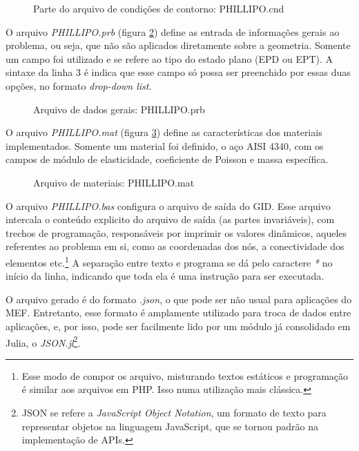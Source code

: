 \begin{figure}[hbtp]
    \caption{Parte do arquivo de condições de contorno: PHILLIPO.cnd}
    
    \label{fig:PHILLIPO.cnd_2}
\end{figure}

O arquivo \emph{PHILLIPO.prb} (figura \ref{fig:PHILLIPO.prb}) define as entrada de informações gerais ao problema, ou seja, que não são aplicados diretamente sobre a geometria. Somente um campo foi utilizado e se refere ao tipo do estado plano (EPD ou EPT). A sintaxe da linha 3 é indica que esse campo só possa ser preenchido por essas duas opções, no formato \emph{drop-down list}.
\begin{figure}[hbtp]
    \caption{Arquivo de dados gerais: PHILLIPO.prb}
    
    \label{fig:PHILLIPO.prb}
\end{figure}

O arquivo \emph{PHILLIPO.mat} (figura \ref{fig:PHILLIPO.mat}) define as características dos materiais implementados. Somente um material foi definido, o aço AISI 4340, com os campos de módulo de elasticidade, coeficiente de Poisson e massa específica.

\begin{figure}[hbtp]
    \caption{Arquivo de materiais: PHILLIPO.mat}
    
    \label{fig:PHILLIPO.mat}
\end{figure}

O arquivo \emph{PHILLIPO.bas} configura o arquivo de saída do GID. Esse arquivo intercala o conteúdo explicito do arquivo de saída (as partes invariáveis), com trechos de programação, responsáveis por imprimir os valores dinâmicos, aqueles referentes ao problema em si, como as coordenadas dos nós, a conectividade dos elementos etc.\footnote{Esse modo de compor os arquivo, misturando textos estáticos e programação é similar aos arquivos em PHP. Isso numa utilização mais clássica.} A separação entre texto e programa se dá pelo caractere \emph{*} no início da linha, indicando que toda ela é uma instrução para ser executada. 

O arquivo gerado é do formato \emph{.json}, o que pode ser não usual para aplicações do MEF. Entretanto, esse formato é amplamente utilizado para troca de dados entre aplicações, e, por isso, pode ser facilmente lido por um módulo já consolidado em Julia, o \emph{JSON.jl}\footnote{JSON se refere a \emph{JavaScript Object Notation}, um formato de texto para representar objetos na linguagem JavaScript, que se tornou padrão na implementação de APIs.}. 

